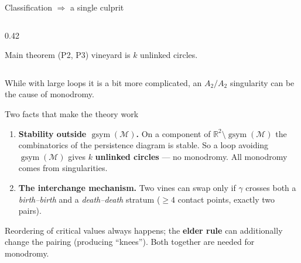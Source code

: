 \documentclass[
	11pt,
	aspectratio=169, %
]{beamer}
\newcommand{\R}{\mathbb{R}}
\newcommand{\M}{\mathcal{M}}
\DeclareMathOperator{\gsym}{gsym}
\begin{document}
\begin{frame}{Classification $\Rightarrow$ a single culprit}
\begin{columns}[T]
\begin{column}{0.42\textwidth}
\begin{block}{Main theorem (P2, P3)}
{                vineyard is $k$ unlinked circles.}
            \end{block}
        \end{column}
    \end{columns}
    \vspace{0.7em}
    \pause
    While with large loops it is a bit more complicated, an $A_2/A_2$ singularity can be the cause of monodromy.
\end{frame}

\begin{frame}{Two facts that make the theory work}
    \begin{enumerate}
        \item \textbf{Stability outside $\gsym(\M)$.} On a component of $\R^2\setminus\gsym(\M)$ the combinatorics of the persistence diagram is stable. So a loop avoiding $\gsym(\M)$ gives $k$ \textbf{unlinked circles} --- no monodromy. All monodromy comes from singularities.
        \item \textbf{The interchange mechanism.} Two vines can swap only if $\gamma$ crosses both a \emph{birth--birth} and a \emph{death--death} stratum ($\ge 4$ contact points, exactly two pairs).
    \end{enumerate}
    \vspace{0.3em}
    {\footnotesize Reordering of critical values always happens; the \textbf{elder
    rule} can additionally change the pairing (producing ``knees''). Both together
    are needed for monodromy.}
\end{frame}
\end{document}
